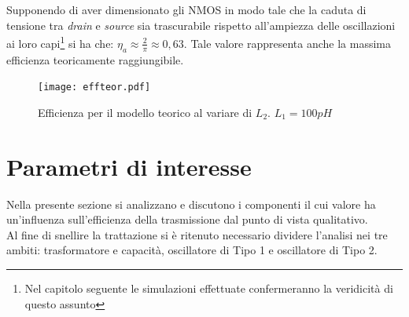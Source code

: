 \documentclass[a4paper, 12pt]{memoir}
\begin{document}
Supponendo di aver dimensionato gli NMOS in modo tale che la caduta di tensione
tra \emph{drain} e \emph{source} sia trascurabile rispetto all'ampiezza delle
oscillazioni ai loro capi\footnote{Nel capitolo seguente le simulazioni
effettuate confermeranno la veridicità di questo assunto} si ha che:  
$\eta_a \approx \frac{2}{\pi} \approx 0,63$. Tale valore rappresenta anche la
massima efficienza teoricamente raggiungibile.
\begin{figure}[h]
\centering
\texttt{[image: effteor.pdf]}
\caption{Efficienza per il modello teorico al variare di $L_2$. $ L_1 = 100pH$}
\end{figure}

\clearpage
\section{Parametri di interesse}
Nella presente sezione si analizzano e discutono i componenti il cui valore ha
un'influenza sull'efficienza della trasmissione dal punto di vista qualitativo.
\\Al fine di snellire la trattazione si è ritenuto necessario dividere 
l'analisi nei tre ambiti: trasformatore e capacità, oscillatore di Tipo 1 e
oscillatore di Tipo 2.
\end{document}
